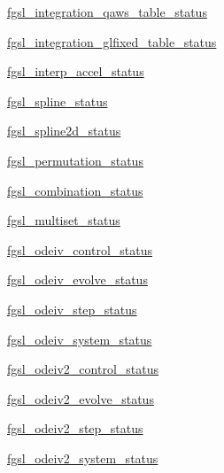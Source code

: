 \begin{DoxyCompactItemize}
\hyperlink{interfacefgsl__well__defined_a09abcd015959c50185f8b45c7ebcf98f}{fgsl\+\_\+integration\+\_\+qaws\+\_\+table\+\_\+status}
\item 
\hyperlink{interfacefgsl__well__defined_ab90b0b9d8c75b94409b749a87c6deed0}{fgsl\+\_\+integration\+\_\+glfixed\+\_\+table\+\_\+status}
\item 
\hyperlink{interfacefgsl__well__defined_a6d96ec1eb035e67c087c49650e447a01}{fgsl\+\_\+interp\+\_\+accel\+\_\+status}
\item 
\hyperlink{interfacefgsl__well__defined_ad7813b7c806549ae5313bb4d0cf0f6dc}{fgsl\+\_\+spline\+\_\+status}
\item 
\hyperlink{interfacefgsl__well__defined_ab0ddaba3415968ec9ad72f5211f82515}{fgsl\+\_\+spline2d\+\_\+status}
\item 
\hyperlink{interfacefgsl__well__defined_ae2019a88a04399d84a8a9ff0939b9fd0}{fgsl\+\_\+permutation\+\_\+status}
\item 
\hyperlink{interfacefgsl__well__defined_a5c1398f32d6a7a13b8827e2fc5990b12}{fgsl\+\_\+combination\+\_\+status}
\item 
\hyperlink{interfacefgsl__well__defined_a18cc5790e386d40f3c63a560d9c0126c}{fgsl\+\_\+multiset\+\_\+status}
\item 
\hyperlink{interfacefgsl__well__defined_a4e14590dbb12724805a7090428a9cecf}{fgsl\+\_\+odeiv\+\_\+control\+\_\+status}
\item 
\hyperlink{interfacefgsl__well__defined_a6924068e0d5d62d91a69786571db90f9}{fgsl\+\_\+odeiv\+\_\+evolve\+\_\+status}
\item 
\hyperlink{interfacefgsl__well__defined_a1c76c474049ea289f348687c730f2f2a}{fgsl\+\_\+odeiv\+\_\+step\+\_\+status}
\item 
\hyperlink{interfacefgsl__well__defined_a4c099e60eff73f6d01a3e6ef8891a521}{fgsl\+\_\+odeiv\+\_\+system\+\_\+status}
\item 
\hyperlink{interfacefgsl__well__defined_aef92f52d97a8ab3204731f7d79dba32b}{fgsl\+\_\+odeiv2\+\_\+control\+\_\+status}
\item 
\hyperlink{interfacefgsl__well__defined_af310c60d5bc311ea9b22d04f090ec6ef}{fgsl\+\_\+odeiv2\+\_\+evolve\+\_\+status}
\item 
\hyperlink{interfacefgsl__well__defined_a037f0ecc2cae0b48a28fbc0a9e85dcbc}{fgsl\+\_\+odeiv2\+\_\+step\+\_\+status}
\item 
\hyperlink{interfacefgsl__well__defined_a447d26ad4612e3d1006cdd6fd4a0373e}{fgsl\+\_\+odeiv2\+\_\+system\+\_\+status}
\item 

\end{DoxyCompactItemize}
